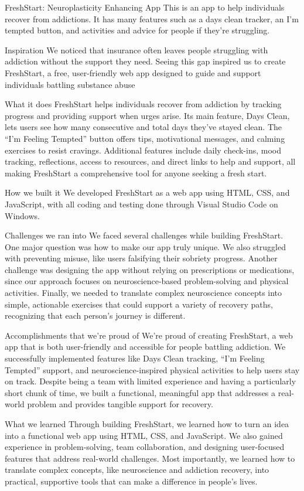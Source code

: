 FreshStart: Neuroplasticity Enhancing App
This is an app to help individuals recover from addictions. It has many features such as a days clean tracker, an I'm tempted button, and activities and advice for people if they're struggling.

Inspiration
We noticed that insurance often leaves people struggling with addiction without the support they need. Seeing this gap inspired us to create FreshStart, a free, user-friendly web app designed to guide and support individuals battling substance abuse

What it does
FreshStart helps individuals recover from addiction by tracking progress and providing support when urges arise. Its main feature, Days Clean, lets users see how many consecutive and total days they’ve stayed clean. The “I’m Feeling Tempted” button offers tips, motivational messages, and calming exercises to resist cravings. Additional features include daily check-ins, mood tracking, reflections, access to resources, and direct links to help and support, all making FreshStart a comprehensive tool for anyone seeking a fresh start.

How we built it
We developed FreshStart as a web app using HTML, CSS, and JavaScript, with all coding and testing done through Visual Studio Code on Windows.

Challenges we ran into
We faced several challenges while building FreshStart. One major question was how to make our app truly unique. We also struggled with preventing misuse, like users falsifying their sobriety progress. Another challenge was designing the app without relying on prescriptions or medications, since our approach focuses on neuroscience-based problem-solving and physical activities. Finally, we needed to translate complex neuroscience concepts into simple, actionable exercises that could support a variety of recovery paths, recognizing that each person’s journey is different.

Accomplishments that we're proud of
We’re proud of creating FreshStart, a web app that is both user-friendly and accessible for people battling addiction. We successfully implemented features like Days Clean tracking, “I’m Feeling Tempted” support, and neuroscience-inspired physical activities to help users stay on track. Despite being a team with limited experience and having a particularly short chunk of time, we built a functional, meaningful app that addresses a real-world problem and provides tangible support for recovery.

What we learned
Through building FreshStart, we learned how to turn an idea into a functional web app using HTML, CSS, and JavaScript. We also gained experience in problem-solving, team collaboration, and designing user-focused features that address real-world challenges. Most importantly, we learned how to translate complex concepts, like neuroscience and addiction recovery, into practical, supportive tools that can make a difference in people’s lives.

